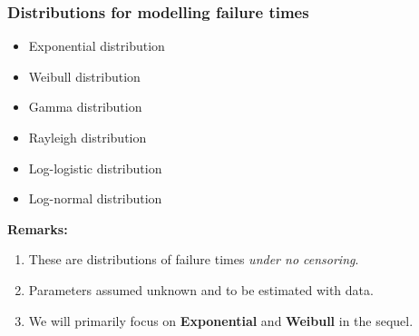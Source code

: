 \documentclass{beamer}
\newcounter{example}
\newcommand{\examp}{\refstepcounter{example}
       { \textbf{Example 8.\arabic{example}.}\ }}
\begin{document}
\begin{frame} \frametitle{Distributions for modelling failure times}

\begin{itemize}
\item Exponential distribution
\item Weibull distribution
\item Gamma distribution
\item Rayleigh distribution
\item Log-logistic distribution
\item Log-normal distribution
\end{itemize}

\textbf{Remarks:} 
\begin{enumerate}
\item
These are distributions of failure times 
\emph{under no censoring}.
\item
Parameters assumed unknown and to be estimated with data.
\item We will primarily focus on  {\bf Exponential} and {\bf Weibull} in the sequel.
\end{enumerate}
\end{frame}



%
%
%


%
\end{document}
